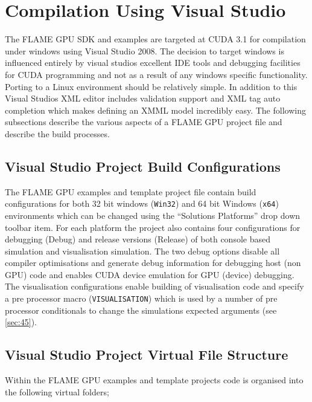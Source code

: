\documentclass[11pt, a4paper, onecolumn, oneside]{report}
\begin{document}
\section{Compilation Using Visual Studio}
\label{sec:44}


The FLAME GPU SDK and examples are targeted at CUDA 3.1 for compilation under windows using Visual Studio 2008.
The decision to target windows is influenced entirely by visual studios excellent IDE tools and debugging facilities for CUDA programming and not as a result of any windows specific functionality.
Porting to a Linux environment should be relatively simple.
In addition to this Visual Studios XML editor includes validation support and XML tag auto completion which makes defining an XMML model incredibly easy.
The following subsections describe the various aspects of a FLAME GPU project file and describe the build processes.

\subsection{Visual Studio Project Build Configurations}
\label{sec:441}


The FLAME GPU examples and template project file contain build configurations for both 32 bit windows (\texttt{Win32}) and 64 bit Windows (\texttt{x64}) environments which can be changed using the ``Solutions Platforms'' drop down toolbar item.
For each platform the project also contains four configurations for debugging (Debug) and release versions (Release) of both console based simulation and visualisation simulation.
The two debug options disable all compiler optimisations and generate debug information for debugging host (non GPU) code and enables CUDA device emulation for GPU (device) debugging.
The visualisation configurations enable building of visualisation code and specify a pre processor macro (\texttt{VISUALISATION}) which is used by a number of pre processor conditionals to change the simulations expected arguments (see \cref{sec:45}).

\subsection{Visual Studio Project Virtual File Structure}
\label{sec:442}


Within the FLAME GPU examples and template projects code is organised into the following virtual folders; 
\end{document}
